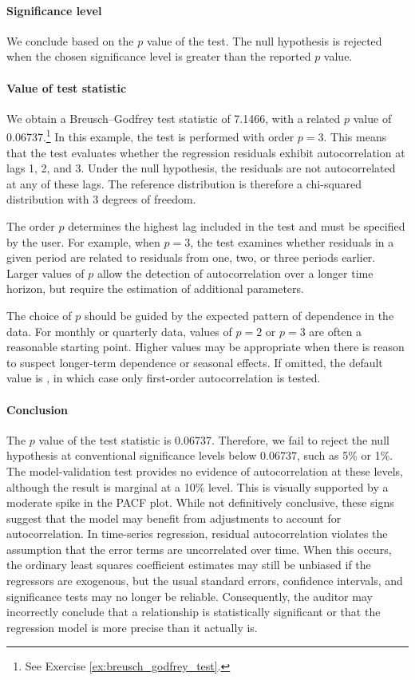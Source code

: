 \paragraph{Significance level} We conclude based on the $p$ value of the test. The null hypothesis is rejected when the chosen significance level is greater than the reported $p$ value.

\paragraph{Value of test statistic} We obtain a Breusch--Godfrey test statistic of 7.1466, with a related $p$ value of 0.06737.\footnote{See Exercise \ref{ex:breusch_godfrey_test}.} 
In this example, the test is performed with order $p=3$.
This means that the test evaluates whether the regression residuals exhibit autocorrelation at lags 1, 2, and 3. 
Under the null hypothesis, the residuals are not autocorrelated at any of these lags. The reference distribution is therefore a chi-squared distribution with 3 degrees of freedom.

The order $p$ determines the highest lag included in the test and must be specified by the user. 
For example, when $p=3$, the test examines whether residuals in a given period are related to residuals from one, two, or three periods earlier. 
Larger values of $p$ allow the detection of autocorrelation over a longer time horizon, but require the estimation of additional parameters.

The choice of $p$ should be guided by the expected pattern of dependence in the data. 
For monthly or quarterly data, values of $p=2$ or $p=3$ are often a reasonable starting point. 
Higher values may be appropriate when there is reason to suspect longer-term dependence or seasonal effects. 
If omitted, the default value is , in which case only first-order autocorrelation is tested.

\paragraph{Conclusion}

The $p$ value of the test statistic is 0.06737. Therefore, we fail to reject the null hypothesis at conventional significance levels below 0.06737, such as 5\% or 1\%. The model-validation test provides no evidence of autocorrelation at these levels, although the result is marginal at a 10\% level.
This is visually supported by a moderate spike in the PACF plot. 
While not definitively conclusive, these signs suggest that the model may benefit from adjustments to account for autocorrelation. 
In time-series regression, residual autocorrelation violates the assumption that the error terms are uncorrelated over time. When this occurs, the ordinary least squares coefficient estimates may still be unbiased if the regressors are exogenous, but the usual standard errors, confidence intervals, and significance tests may no longer be reliable. 
Consequently, the auditor may incorrectly conclude that a relationship is statistically significant or that the regression model is more precise than it actually is.

